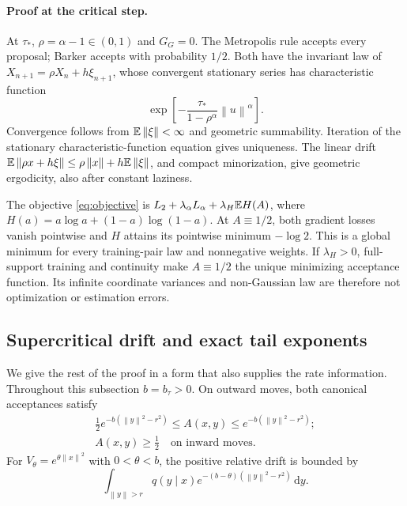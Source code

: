 \documentclass[pdflatex,iicol,sn-mathphys-ay]{sn-jnl}
\theoremstyle{definition}\newtheorem{definition}[theorem]{Definition}
\theoremstyle{remark}\newtheorem{remark}[theorem]{Remark}
\numberwithin{equation}{section}
\newcommand{\norm}[1]{\left\lVert#1\right\rVert}\newcommand{\TV}{\mathrm{TV}}
\newcommand{\dd}{\,\mathrm d}\newcommand{\cA}{c_\alpha}\newcommand{\sg}{\operatorname{sigmoid}}
\newcommand{\1}{\mathbf 1}
\begin{document}
\paragraph{Proof at the critical step.}
At $\tau_*$, $\rho=\alpha-1\in(0,1)$ and $G_G=0$. The Metropolis rule accepts every proposal; Barker accepts with probability $1/2$. Both have the invariant law of
$X_{n+1}=\rho X_n+h\xi_{n+1}$, whose convergent stationary series has characteristic function
\[
\exp\!\left[-\frac{\tau_*}{1-\rho^\alpha}\norm u^\alpha\right].
\]
Convergence follows from $\E\norm\xi<\infty$ and geometric summability. Iteration of the stationary characteristic-function equation gives uniqueness. The linear drift $\E\norm{\rho x+h\xi}\le\rho\norm x+h\E\norm\xi$, and compact minorization, give geometric ergodicity, also after constant laziness.

The objective \eqref{eq:objective} is $L_2+\lambda_\alpha L_\alpha+\lambda_H\mathbb E H(A)$, where $H(a)=a\log a+(1-a)\log(1-a)$. At $A\equiv1/2$, both gradient losses vanish pointwise and $H$ attains its pointwise minimum $-\log2$. This is a global minimum for every training-pair law and nonnegative weights. If $\lambda_H>0$, full-support training and continuity make $A\equiv1/2$ the unique minimizing acceptance function. Its infinite coordinate variances and non-Gaussian law are therefore not optimization or estimation errors.

\subsection{Supercritical drift and exact tail exponents}
We give the rest of the proof in a form that also supplies the rate information. Throughout this subsection $b=b_\tau>0$. On outward moves, both canonical acceptances satisfy
\begin{equation}
\begin{gathered}
\tfrac12e^{-b(\norm y^2-r^2)}\le A(x,y)\le e^{-b(\norm y^2-r^2)};\\
 A(x,y)\ge\tfrac12\quad\text{on inward moves}.
\end{gathered}\label{eq:acceptbounds}
\end{equation}
For $V_\theta=e^{\theta\norm x^2}$ with $0<\theta<b$, the positive relative drift is bounded by
\begin{equation}
\int_{\norm y>r}q(y\mid x)e^{-(b-\theta)(\norm y^2-r^2)}\dd y.\label{eq:positivedrift}
\end{equation}
\end{document}
